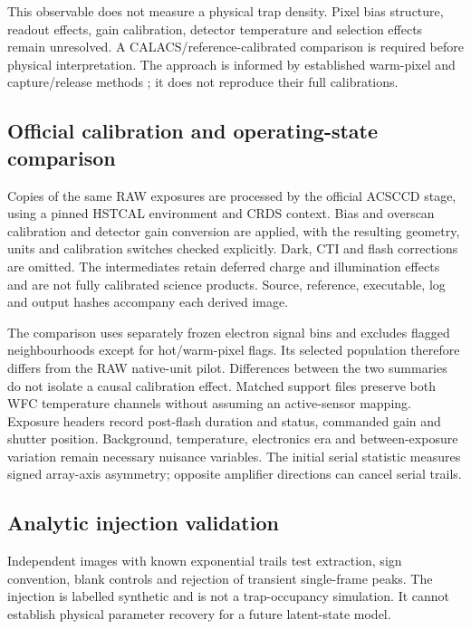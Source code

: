 \documentclass[11pt]{article}
\begin{document}
This observable does not measure a physical trap density. Pixel bias structure,
readout effects, gain calibration, detector temperature and selection effects
remain unresolved. A CALACS/reference-calibrated comparison is required before
physical interpretation. The approach is informed by established warm-pixel and
capture/release methods \citep{anderson2010,massey2026}; it does not reproduce their
full calibrations.
\subsection{Official calibration and operating-state comparison}
Copies of the same RAW exposures are processed by the official ACSCCD stage,
using a pinned HSTCAL environment and CRDS context. Bias and overscan calibration
and detector gain conversion are applied, with the resulting geometry, units and
calibration switches checked explicitly. Dark, CTI and flash corrections are
omitted. The intermediates retain deferred charge and illumination effects and
are not fully calibrated science products. Source, reference, executable, log
and output hashes accompany each derived image.

The comparison uses separately frozen electron signal bins and excludes flagged
neighbourhoods except for hot/warm-pixel flags. Its selected population therefore
differs from the RAW native-unit pilot. Differences between the two summaries do
not isolate a causal calibration effect. Matched support files preserve both WFC
temperature channels without assuming an active-sensor mapping. Exposure headers
record post-flash duration and status, commanded gain and shutter position.
Background, temperature, electronics era and between-exposure variation remain
necessary nuisance variables. The initial serial statistic measures signed
array-axis asymmetry; opposite amplifier directions can cancel serial trails.
\subsection{Analytic injection validation}
Independent images with known exponential trails test extraction, sign convention,
blank controls and rejection of transient single-frame peaks. The injection is
labelled synthetic and is not a trap-occupancy simulation. It cannot establish
physical parameter recovery for a future latent-state model.
\end{document}

